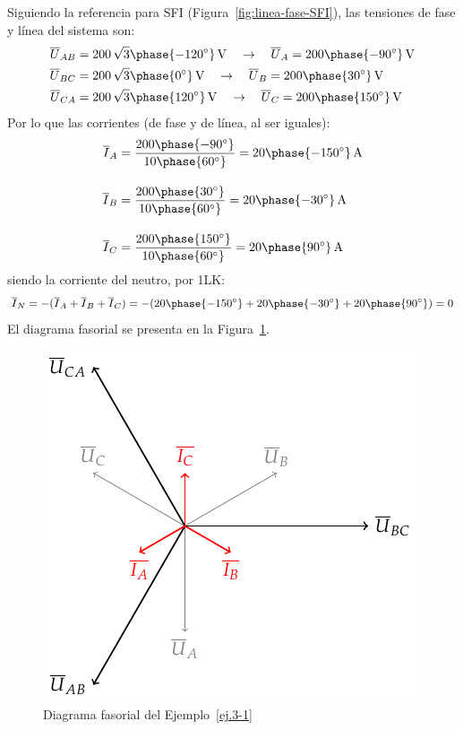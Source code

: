 \begin{example}
	    Siguiendo la referencia para SFI (Figura~\ref{fig:linea-fase-SFI}), las tensiones de fase y línea del sistema son:
	    \begin{align*}
	        \overline{U}_{AB} &= 200\,\sqrt{3}\phase{-120^\circ}\,\si{\volt} \quad\rightarrow\quad \overline{U}_A = 200\phase{-90^\circ}\,\si{\volt}\\
	        \overline{U}_{BC} &= 200\,\sqrt{3}\phase{0^\circ}\,\si{\volt} \quad\rightarrow\quad \overline{U}_B = 200\phase{30^\circ}\,\si{\volt}\\
	        \overline{U}_{CA} &= 200\,\sqrt{3}\phase{120^\circ}\,\si{\volt} \quad\rightarrow\quad \overline{U}_C=200\phase{150^\circ}\,\si{\volt}
	    \end{align*}
	    Por lo que las corrientes (de fase y de línea, al ser iguales):
	    \begin{align*}
	        \overline{I}_A &= \frac{200\phase{-90^\circ}}{10\phase{60^\circ}} =20\phase{-150^\circ} \,\si{\ampere} \\[10pt]
          \overline{I}_B &= \frac{200\phase{30^\circ}}{10\phase{60^\circ}} = 20\phase{-30^\circ} \,\si{\ampere}\\[10pt]
          \overline{I}_C &=\frac{200\phase{150^\circ}}{10\phase{60^\circ}} = 20\phase{90^\circ} \,\si{\ampere}
	    \end{align*}
	    siendo la corriente del neutro, por 1LK:
	    \begin{equation*}
	        \overline{I}_N=-(\overline{I}_A+\overline{I}_B+\overline{I}_C)=-(20\phase{-150^\circ}+20\phase{-30^\circ}+20\phase{90^\circ})=0
	    \end{equation*}
	    El diagrama fasorial se presenta en la Figura~\ref{fig:diagrama_ejemplo_3-1}. 
	    \begin{figure}[H]
	        \centering
	        \includegraphics[width=0.4\linewidth]{../figs/diagrama_ejemplo3_1.pdf}
	        \caption{Diagrama fasorial del Ejemplo~\ref{ej.3-1}}
	        \label{fig:diagrama_ejemplo_3-1}
	    \end{figure}
	\end{example}
	
